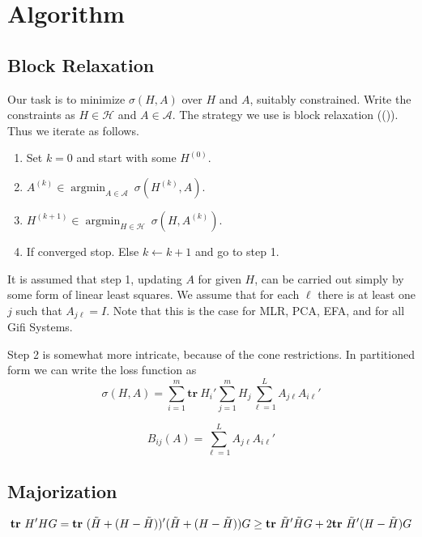 \documentclass[
  12pt,
  letterpaper,
]{scrbook}
\providecommand{\tightlist}{%
  \setlength{\itemsep}{0pt}\setlength{\parskip}{0pt}}
\newcommand{\amin}[1]{\mathop{\text{argmin}}_{#1}}
\begin{document}

\chapter{Algorithm}\label{algorithm}

\section{Block Relaxation}\label{block-relaxation}

Our task is to minimize \(\sigma(H,A)\) over \(H\) and \(A\), suitably
constrained. Write the constraints as \(H\in\mathcal{H}\) and
\(A\in\mathcal{A}\). The strategy we use is block relaxation
(()). Thus we
iterate as follows.

\begin{enumerate}
\def\labelenumi{\arabic{enumi}.}
\setcounter{enumi}{-1}
\tightlist
\item
  Set \(k=0\) and start with some \(H^{(0)}\).
\item
  \(A^{(k)}\in\amin{A\in\mathcal{A}}\ \sigma(H^{(k)},A)\).
\item
  \(H^{(k+1)}\in\amin{H\in\mathcal{H}}\ \sigma(H,A^{(k)})\).
\item
  If converged stop. Else \(k\leftarrow k+1\) and go to step 1.
\end{enumerate}

It is assumed that step 1, updating \(A\) for given \(H\), can be
carried out simply by some form of linear least squares. We assume that
for each \(\ell\) there is at least one \(j\) such that \(A_{j\ell}=I\).
Note that this is the case for MLR, PCA, EFA, and for all Gifi Systems.

Step 2 is somewhat more intricate, because of the cone restrictions. In
partitioned form we can write the loss function as \[
\sigma(H,A)=\sum_{i=1}^m\mathbf{tr}\ H_i'\sum_{j=1}^mH_j\sum_{\ell=1}^LA_{j\ell}A_{i\ell}'
\]

\[
B_{ij}(A)=\sum_{\ell=1}^LA_{j\ell}A_{i\ell}'
\]

\section{Majorization}\label{majorization}

\[
\mathbf{tr}\ H'HG=\mathbf{tr}\ (\tilde H + (H - \tilde H))'(\tilde H + (H - \tilde H))G\geq\\\mathbf{tr}\ \tilde H'\tilde HG+2\mathbf{tr}\ \tilde H'(H - \tilde H)G
\]
\end{document}
